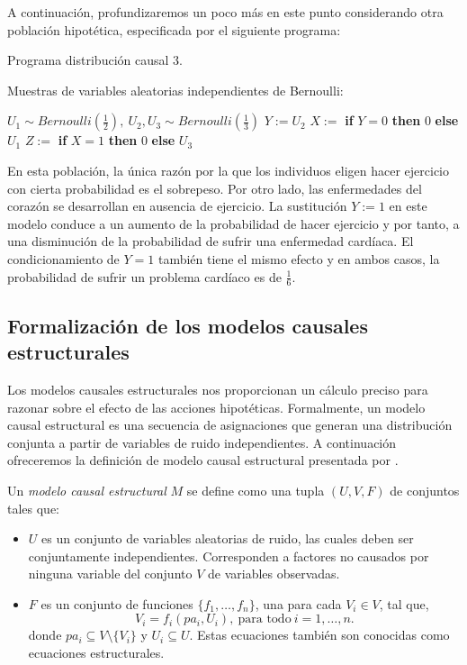 \documentclass[oneside,openright,titlepage,numbers=noenddot,openany,headinclude,footinclude=true,
cleardoublepage=empty,abstractoff,BCOR=5mm,paper=a4,fontsize=12pt,main=spanish]{scrreprt}
\begin{document}
A continuación, profundizaremos un poco más en este punto considerando otra población hipotética, especificada por el siguiente programa:

\begin{algorithm}[h]
\caption{Programa distribución causal 3.}
    Muestras de variables aleatorias independientes de Bernoulli:
     
    $U_1 \sim  Bernoulli\left(\frac{1}{2}\right), \ U_2,U_3 \sim  Bernoulli\left(\frac{1}{3}\right)$\;
    $Y:=U_2$\;
    $X:=$ \textbf{if} $Y=0$ \textbf{then} $0$ \textbf{else} $U_1$\;
    $Z:=$ \textbf{if} $X=1$ \textbf{then} $0$ \textbf{else} $U_3$\;
    \label{alg:programa3}
\end{algorithm}

En esta población, la única razón por la que los individuos eligen hacer ejercicio con cierta probabilidad es el sobrepeso. Por otro lado, las enfermedades del corazón se desarrollan en ausencia de ejercicio. La sustitución $Y := 1$ en este modelo conduce a un aumento de la probabilidad de hacer ejercicio y por tanto, a una disminución de la probabilidad de sufrir una enfermedad cardíaca. El condicionamiento de $Y = 1$ también tiene el mismo efecto y en ambos casos, la probabilidad de sufrir un problema cardíaco es de  $\frac{1}{6}$.

\subsection{Formalización de los modelos causales estructurales}

Los modelos causales estructurales nos proporcionan un cálculo preciso para razonar sobre el efecto de las acciones hipotéticas. Formalmente, un modelo causal estructural es una secuencia de asignaciones que generan una distribución conjunta a partir de variables de ruido independientes. A continuación ofreceremos la definición de modelo causal estructural presentada por \cite{causality2000}.\\

\begin{definition} \label{def:modcausalest}
Un \textit{modelo causal estructural} $M$ se define como una tupla $(U,V,F)$ de conjuntos tales que:
\begin{itemize}
    \item $U$ es un conjunto de variables aleatorias de ruido, las cuales deben ser conjuntamente independientes. Corresponden a factores no causados por ninguna variable del conjunto $V$ de variables observadas.
    \item $F$ es un conjunto de funciones $\{f_1,\dots,f_n\}$, una para cada $V_i\in V$, tal que, $$V_i=f_i(pa_i,U_i), \ \text{para todo} \ i=1,\dots,n.$$
    donde $pa_i \subseteq V \setminus \{V_i\}$ y $U_i \subseteq U$. Estas ecuaciones también son conocidas como ecuaciones estructurales.
\end{itemize}
\end{definition}\
\end{document}
